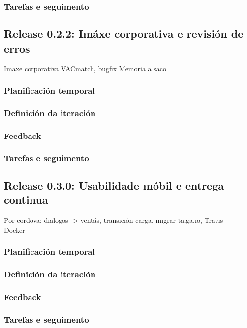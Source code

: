       \subsubsection{Tarefas e seguimento}

    \subsection{Release 0.2.2: Imáxe corporativa e revisión de erros}
    Imaxe corporativa VACmatch, bugfix
    Memoria a saco
      \subsubsection{Planificación temporal}
      \subsubsection{Definición da iteración}
      \subsubsection{Feedback}
      \subsubsection{Tarefas e seguimento}

    \subsection{Release 0.3.0: Usabilidade móbil e entrega continua}
    Por cordova: dialogos -> ventás, transición carga, migrar taiga.io, Travis + 
Docker
      \subsubsection{Planificación temporal}
      \subsubsection{Definición da iteración}
      \subsubsection{Feedback}
      \subsubsection{Tarefas e seguimento}
